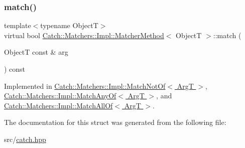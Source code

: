 \subsubsection{\texorpdfstring{match()}{match()}}
{\footnotesize\ttfamily template$<$typename ObjectT$>$ \\
virtual bool \hyperlink{struct_catch_1_1_matchers_1_1_impl_1_1_matcher_method}{Catch\+::\+Matchers\+::\+Impl\+::\+Matcher\+Method}$<$ ObjectT $>$\+::match (\begin{DoxyParamCaption}\item[{ObjectT const \&}]{arg }\end{DoxyParamCaption}) const\hspace{0.3cm}{\ttfamily [pure virtual]}}



Implemented in \hyperlink{struct_catch_1_1_matchers_1_1_impl_1_1_match_not_of_a1b9ad6566e4ab0f292d2903f557307cc}{Catch\+::\+Matchers\+::\+Impl\+::\+Match\+Not\+Of$<$ Arg\+T $>$}, \hyperlink{struct_catch_1_1_matchers_1_1_impl_1_1_match_any_of_a73be317ecf5919af855af96d68e714b9}{Catch\+::\+Matchers\+::\+Impl\+::\+Match\+Any\+Of$<$ Arg\+T $>$}, and \hyperlink{struct_catch_1_1_matchers_1_1_impl_1_1_match_all_of_a7bf0c2d8cedf67ecf9d0a527cb5a8263}{Catch\+::\+Matchers\+::\+Impl\+::\+Match\+All\+Of$<$ Arg\+T $>$}.



The documentation for this struct was generated from the following file\+:\begin{DoxyCompactItemize}
\item 
src/\hyperlink{catch_8hpp}{catch.\+hpp}\end{DoxyCompactItemize}
